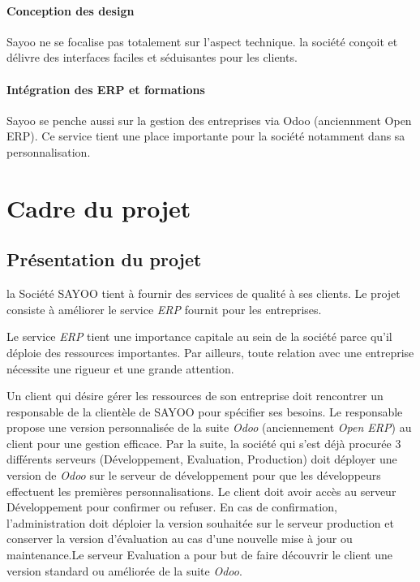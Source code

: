 \begin{onehalfspace}
\paragraph*{Conception des design}
Sayoo ne se focalise pas totalement sur l'aspect technique. la société conçoit et délivre des interfaces faciles et séduisantes pour les clients.

\paragraph*{Intégration des ERP et formations}
Sayoo se penche aussi sur la gestion des entreprises via Odoo (anciennment Open ERP). Ce service tient une place importante pour la société notamment dans sa personnalisation.

\section{Cadre du projet}


\subsection{Présentation du projet}
 
la Société SAYOO tient à fournir des services de qualité à ses clients. Le projet consiste à améliorer le service \emph{ERP} fournit pour les entreprises.

Le service \emph{ERP} tient une importance capitale au sein de la société parce qu'il déploie des ressources importantes. Par ailleurs, toute relation avec une entreprise nécessite une rigueur et une grande attention.

Un client qui désire gérer les ressources de son entreprise  doit rencontrer un responsable de la clientèle de SAYOO pour spécifier ses besoins. Le responsable propose une version personnalisée de la suite \emph{Odoo} (anciennement \emph{Open ERP}) au client pour une gestion efficace. Par la suite, la société qui s'est déjà procurée  3 différents serveurs (Développement, Evaluation, Production) doit déployer une version de \emph{Odoo} sur le serveur de développement pour que les développeurs effectuent les premières personnalisations. Le client doit avoir accès au serveur Développement pour confirmer ou refuser. En cas de confirmation, l'administration doit déploier la version souhaitée sur le serveur production et conserver la version d'évaluation au cas d'une nouvelle mise à jour ou maintenance.Le serveur Evaluation a pour but de faire découvrir le client une version standard ou améliorée de la suite \emph{Odoo}.  


\end{onehalfspace}
